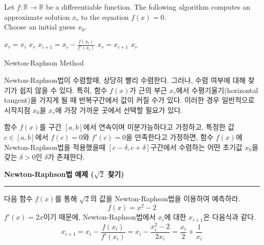 \begin{algorithm}
Let $f:\mathbb{R}\rightarrow\mathbb{R}$ be a differentiable function. The following algorithm computes an approximate solution $x_{r}$ to the equation $f(x)=0$.\\
Choose an initial guess $x_{0}$.
\begin{algorithmic}
    \State $x_{r}=x_{i}$
    \State \Return $x_{r}$
  \EndIf
  \State $x_{i+1}=x_{i}-\frac{f(x_{i})}{f'(x_{i})}$
    \State $x_{r}=x_{i+1}$
    \State \Return $x_{r}$
  \EndIf
\EndFor
\end{algorithmic}
\caption{Newton-Raphson Method}
\end{algorithm}
Newton-Raphson법이 수렴할때, 상당히 빨리 수렴한다. 그러나, 수렴 여부에 대해 찾기가 쉽지 않을 수 있다. 특히, 함수 $f(x)$가 근의 부근 $x_{r}$에서 수평기울기(horizontal tangent)을 가지게 될 때 반복구간에서 값이 커질 수가 있다. 이러한 경우 일반적으로 시작지점 $x_{0}$을 $x_{r}$에 가장 가까운 곳에서 선택할 필요가 있다.
\begin{theorem}
함수 $f(x)$를 구간 $[a,b]$에서 연속이며 미분가능하다고 가정하고, 특정한 값 $c \in [a,b]$에서 $f(c)=0$와 $f'(c)=0$을 만족한다고 가정하면, 함수 $f(x)$에 Newton-Raphson법을 적용했을때 $[c-\delta,c+\delta]$구간에서 수렴하는 어떤 초기값 $x_{0}$을 갖는 $\delta >0$인 $\delta$가 존재한다.
\end{theorem}

 \textbf{Newton-Raphson법 예제 ($\sqrt{2}$ 찾기)}\\
\rule{\textwidth}{0.1pt}
다음 함수 $f(x)$를 통해 $\sqrt{2}$의 값을 Newton-Raphson법을 이용하여 예측하라.
\begin{equation}
f(x)=x^2 -2
\end{equation}
$f'(x)=2x$이기 때문에, Newton-Raphson법에서 $x_{i}$에 대한 $x_{i+1}$은 다음식과 같다.
\begin{equation}
x_{i+1}=x_{i}-\frac{f(x_{i})}{f'(x_{i})}
=x_{i}-\frac{x_{i}^2-2}{2x_{i}}
=\frac{x_{i}}{2}+\frac{1}{x_{i}}
\end{equation}

